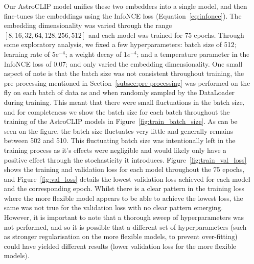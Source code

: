 Our AstroCLIP model unifies these two embedders into a single model, and then fine-tunes the embeddings using the InfoNCE loss
(Equation~\eqref{eq:infonce}).
The embedding dimensionality was varied through the range $[8, 16, 32, 64, 128, 256, 512]$ and each model was trained for
75 epochs.
Through some exploratory analysis, we fixed a few hyperparameters: batch size of 512; learning rate of $5e^{-4}$; a weight
decay of $1e^{-4}$; and a temperature parameter in the InfoNCE loss of 0.07; and only varied the embedding dimensionality.
One small aspect of note is that the batch size was not consistent throughout training, the pre-processing mentioned in
Section~\eqref{subsec:pre-processing} was performed on the fly on each batch of data as and when randomly sampled by
the DataLoader during training.
This meant that there were small fluctuations in the batch size, and for completeness we show the batch size for each batch
throughout the training of the AstroCLIP models in Figure~\eqref{fig:train_batch_size}.
As can be seen on the figure, the batch size fluctuates very little and generally remains between 502 and 510.
This fluctuating batch size was intentionally left in the training process as it's effects were negligible and would likely
only have a positive effect through the stochasticity it introduces.
Figure~\eqref{fig:train_val_loss} shows the training and validation loss for each model throughout the 75 epochs, and
Figure~\eqref{fig:val_loss} details the lowest validation loss achieved for each model and the corresponding epoch.
Whilst there is a clear pattern in the training loss where the more flexible model appears to be able to achieve the
lowest loss, the same was not true for the validation loss with no clear pattern emerging.
However, it is important to note that a thorough sweep of hyperparameters was not performed, and so it is possible that
a different set of hyperparameters (such as stronger regularisation on the more flexible models, to prevent over-fitting)
could have yielded different results (lower validation loss for the more flexible models).
